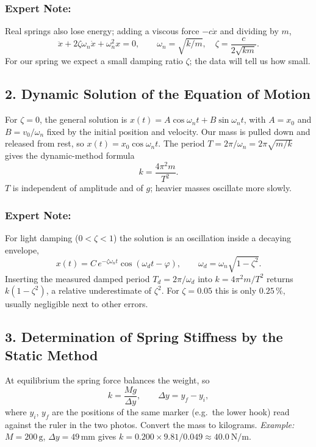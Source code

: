\documentclass[12pt,a4paper]{article}
\begin{document}
\subsubsection{Expert Note:} Real springs also lose energy; adding a viscous force $-c\dot x$ and dividing by $m$,
\[
\ddot x + 2\zeta\omega_n\dot x + \omega_n^2 x = 0,
\qquad \omega_n=\sqrt{k/m},\quad \zeta=\frac{c}{2\sqrt{km}} .
\]
For our spring we expect a small damping ratio $\zeta$; the data will tell us how small.

\subsection*{2. Dynamic Solution of the Equation of Motion}

For $\zeta=0$, the general solution is $x(t)=A\cos\omega_n t + B\sin\omega_n t$, with $A=x_0$ and $B=v_0/\omega_n$ fixed by the initial position and velocity. Our mass is pulled down and released from rest, so $x(t)=x_0\cos\omega_n t$. The period $T=2\pi/\omega_n=2\pi\sqrt{m/k}$ gives the dynamic-method formula
\[
k=\frac{4\pi^2 m}{T^2}.
\]
$T$ is independent of amplitude and of $g$; heavier masses oscillate more slowly.

\subsubsection{Expert Note:} For light damping ($0<\zeta<1$) the solution is an oscillation inside a decaying envelope,
\[
x(t)=C\,e^{-\zeta\omega_n t}\cos(\omega_d t-\varphi),
\qquad \omega_d=\omega_n\sqrt{1-\zeta^2}.
\]
Inserting the measured damped period $T_d=2\pi/\omega_d$ into $k=4\pi^2m/T^2$ returns $k(1-\zeta^2)$, a relative underestimate of $\zeta^2$. For $\zeta=0.05$ this is only $0.25\,\%$, usually negligible next to other errors.

\subsection*{3. Determination of Spring Stiffness by the Static Method}

At equilibrium the spring force balances the weight, so
\[
k=\frac{Mg}{\Delta y},\qquad \Delta y=y_f-y_i ,
\]
where $y_i$, $y_f$ are the positions of the same marker (e.g.\ the lower hook) read against the ruler in the two photos. Convert the mass to kilograms. \emph{Example:} $M=200\,\text{g}$, $\Delta y=49\,\text{mm}$ gives $k=0.200\times9.81/0.049\approx 40.0\ \text{N/m}$.
\end{document}
